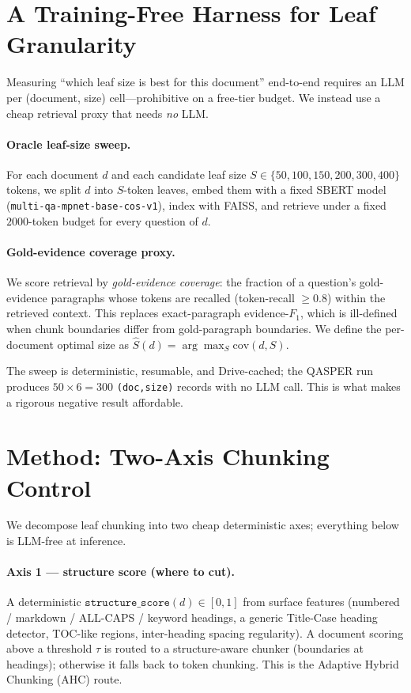 \documentclass[11pt]{article}
\begin{document}
\section{A Training-Free Harness for Leaf Granularity}
\label{sec:harness}

Measuring ``which leaf size is best for this document'' end-to-end requires an
LLM per (document, size) cell---prohibitive on a free-tier budget. We instead
use a cheap retrieval proxy that needs \emph{no} LLM.

\paragraph{Oracle leaf-size sweep.} For each document $d$ and each candidate leaf
size $S \in \{50,100,150,200,300,400\}$ tokens, we split $d$ into $S$-token
leaves, embed them with a fixed SBERT model
(\texttt{multi-qa-mpnet-base-cos-v1}), index with FAISS, and retrieve under a
fixed $2000$-token budget for every question of $d$.

\paragraph{Gold-evidence coverage proxy.} We score retrieval by
\emph{gold-evidence coverage}: the fraction of a question's gold-evidence
paragraphs whose tokens are recalled (token-recall $\ge 0.8$) within the
retrieved context. This replaces exact-paragraph evidence-$F_1$, which is
ill-defined when chunk boundaries differ from gold-paragraph boundaries. We
define the per-document optimal size as
$\hat S(d) = \arg\max_S \mathrm{cov}(d,S)$.

The sweep is deterministic, resumable, and Drive-cached; the QASPER run produces
$50 \times 6 = 300$ \texttt{(doc,size)} records with no LLM call. This is what
makes a rigorous negative result affordable.

\section{Method: Two-Axis Chunking Control}
\label{sec:method}

We decompose leaf chunking into two cheap deterministic axes; everything below is
LLM-free at inference.

\paragraph{Axis 1 --- structure score (where to cut).} A deterministic
$\texttt{structure\_score}(d)\in[0,1]$ from surface features (numbered / markdown
/ ALL-CAPS / keyword headings, a generic Title-Case heading detector, TOC-like
regions, inter-heading spacing regularity). A document scoring above a threshold
$\tau$ is routed to a structure-aware chunker (boundaries at headings); otherwise
it falls back to token chunking. This is the Adaptive Hybrid Chunking (AHC) route.
\end{document}

